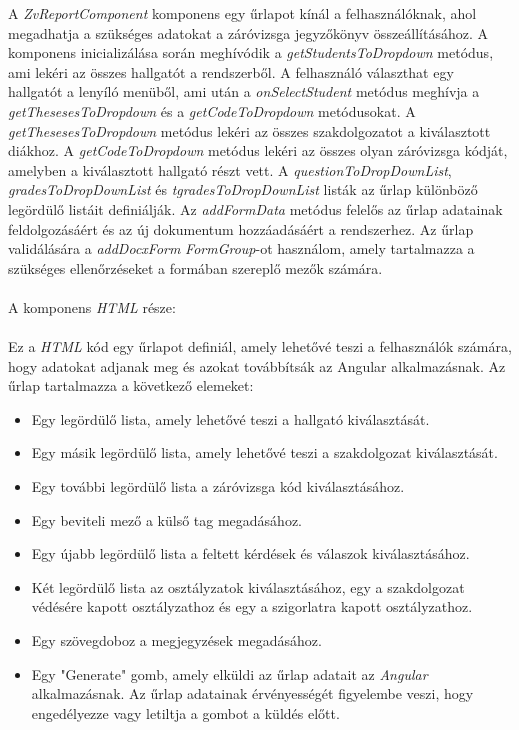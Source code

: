 A \textit{ZvReportComponent} komponens egy űrlapot kínál a felhasználóknak, ahol megadhatja a szükséges adatokat a záróvizsga jegyzőkönyv összeállításához. A komponens inicializálása során meghívódik a \textit{getStudentsToDropdown} metódus, ami lekéri az összes hallgatót a rendszerből. A felhasználó választhat egy hallgatót a lenyíló menüből, ami után a \textit{onSelectStudent} metódus meghívja a \textit{getThesesesToDropdown} és a \textit{getCodeToDropdown} metódusokat. A \textit{getThesesesToDropdown} metódus lekéri az összes szakdolgozatot a kiválasztott diákhoz. A \textit{getCodeToDropdown} metódus lekéri az összes olyan záróvizsga kódját, amelyben a kiválasztott hallgató részt vett. A \textit{questionToDropDownList}, \textit{gradesToDropDownList} és \textit{tgradesToDropDownList} listák az űrlap különböző legördülő listáit definiálják. Az \textit{addFormData} metódus felelős az űrlap adatainak feldolgozásáért és az új dokumentum hozzáadásáért a rendszerhez. Az űrlap validálására a \textit{addDocxForm} \textit{FormGroup}-ot használom, amely tartalmazza a szükséges ellenőrzéseket a formában szereplő mezők számára.\\
\\A komponens \textit{HTML} része:\\
\\
Ez a \textit{HTML} kód egy űrlapot definiál, amely lehetővé teszi a felhasználók számára, hogy adatokat adjanak meg és azokat továbbítsák az Angular alkalmazásnak. Az űrlap tartalmazza a következő elemeket:

\begin{itemize}

\item{}Egy legördülő lista, amely lehetővé teszi a hallgató kiválasztását.
\item{}Egy másik legördülő lista, amely lehetővé teszi a szakdolgozat kiválasztását.
\item{}Egy további legördülő lista a záróvizsga kód kiválasztásához.
\item{}Egy beviteli mező a külső tag megadásához.
\item{}Egy újabb legördülő lista a feltett kérdések és válaszok kiválasztásához.
\item{}Két legördülő lista az osztályzatok kiválasztásához, egy a szakdolgozat védésére kapott osztályzathoz és egy a szigorlatra kapott osztályzathoz.
\item{}Egy szövegdoboz a megjegyzések megadásához.
\item{}Egy "Generate" gomb, amely elküldi az űrlap adatait az \textit{Angular} alkalmazásnak. Az űrlap adatainak érvényességét figyelembe veszi, hogy engedélyezze vagy letiltja a gombot a küldés előtt.

\end{itemize}